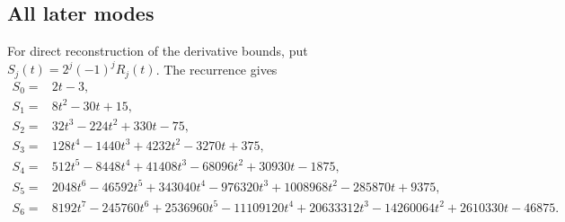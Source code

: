 \subsection{All later modes}

For direct reconstruction of the derivative bounds, put
\(S_j(t)=2^j(-1)^jR_j(t)\). The recurrence gives
\begin{align*}
S_0={}&2t-3,\\
S_1={}&8t^2-30t+15,\\
S_2={}&32t^3-224t^2+330t-75,\\
S_3={}&128t^4-1440t^3+4232t^2-3270t+375,\\
S_4={}&512t^5-8448t^4+41408t^3-68096t^2+30930t-1875,\\
S_5={}&2048t^6-46592t^5+343040t^4-976320t^3
       +1008968t^2-285870t+9375,\\
S_6={}&8192t^7-245760t^6+2536960t^5-11109120t^4
       +20633312t^3-14260064t^2+2610330t-46875.
\end{align*}

